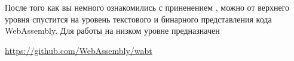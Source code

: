 \label{wabt}

После того как вы немного ознакомились с приненением \wasm, можно от верхнего
уровня спустится на уровень текстового и бинарного представления кода
WebAssembly. Для работы на низком уровне предназначен

\url{https://github.com/WebAssembly/wabt}
